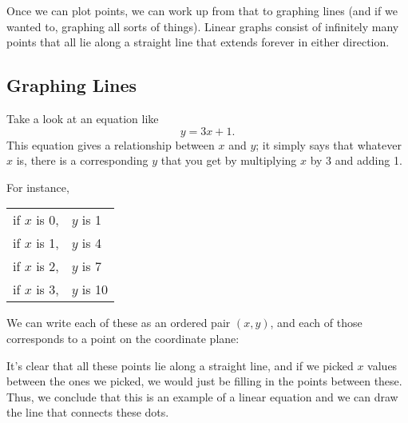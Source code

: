Once we can plot points, we can work up from that to graphing lines (and if we wanted to, graphing all sorts of things).  Linear graphs consist of infinitely many points that all lie along a straight line that extends forever in either direction.
\vfill
\pagebreak

\subsection{Graphing Lines}
Take a look at an equation like \[y=3x+1.\]  This equation gives a relationship between $x$ and $y$; it simply says that whatever $x$ is, there is a corresponding $y$ that you get by multiplying $x$ by 3 and adding 1.  

For instance, 
\begin{center}
\begin{tabular}{l l}
if $x$ is 0, & $y$ is 1\\
if $x$ is 1, & $y$ is 4\\
if $x$ is 2, & $y$ is 7\\
if $x$ is 3, & $y$ is 10
\end{tabular}
\end{center}

We can write each of these as an ordered pair $(x,y)$, and each of those corresponds to a point on the coordinate plane:
\begin{center}
\end{center}

It's clear that all these points lie along a straight line, and if we picked $x$ values between the ones we picked, we would just be filling in the points between these.  Thus, we conclude that this is an example of a linear equation and we can draw the line that connects these dots.

